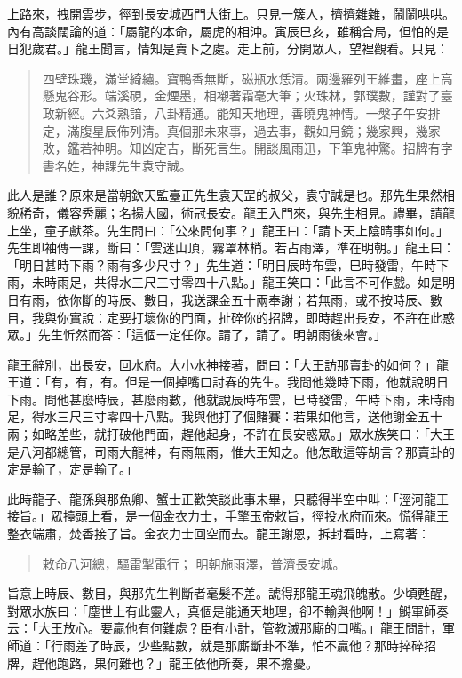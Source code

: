 上路來，拽開雲步，徑到長安城西門大街上。只見一簇人，擠擠雜雜，鬧鬧哄哄。內有高談闊論的道：「屬龍的本命，屬虎的相沖。寅辰巳亥，雖稱合局，但怕的是日犯歲君。」龍王聞言，情知是賣卜之處。走上前，分開眾人，望裡觀看。只見：
\begin{quote}
四壁珠璣，滿堂綺繡。寶鴨香無斷，磁瓶水恁清。兩邊羅列王維畫，座上高懸鬼谷形。端溪硯，金煙墨，相襯著霜毫大筆；火珠林，郭璞數，謹對了臺政新經。六爻熟諳，八卦精通。能知天地理，善曉鬼神情。一槃子午安排定，滿腹星辰佈列清。真個那未來事，過去事，觀如月鏡；幾家興，幾家敗，鑑若神明。知凶定吉，斷死言生。開談風雨迅，下筆鬼神驚。招牌有字書名姓，神課先生袁守誠。
\end{quote}

此人是誰？原來是當朝欽天監臺正先生袁天罡的叔父，袁守誠是也。那先生果然相貌稀奇，儀容秀麗；名揚大國，術冠長安。龍王入門來，與先生相見。禮畢，請龍上坐，童子獻茶。先生問曰：「公來問何事？」龍王曰：「請卜天上陰晴事如何。」先生即袖傳一課，斷曰：「雲迷山頂，霧罩林梢。若占雨澤，準在明朝。」龍王曰：「明日甚時下雨？雨有多少尺寸？」先生道：「明日辰時布雲，巳時發雷，午時下雨，未時雨足，共得水三尺三寸零四十八點。」龍王笑曰：「此言不可作戲。如是明日有雨，依你斷的時辰、數目，我送課金五十兩奉謝；若無雨，或不按時辰、數目，我與你實說：定要打壞你的門面，扯碎你的招牌，即時趕出長安，不許在此惑眾。」先生忻然而答：「這個一定任你。請了，請了。明朝雨後來會。」

龍王辭別，出長安，回水府。大小水神接著，問曰：「大王訪那賣卦的如何？」龍王道：「有，有，有。但是一個掉嘴口討春的先生。我問他幾時下雨，他就說明日下雨。問他甚麼時辰，甚麼雨數，他就說辰時布雲，巳時發雷，午時下雨，未時雨足，得水三尺三寸零四十八點。我與他打了個賭賽：若果如他言，送他謝金五十兩；如略差些，就打破他門面，趕他起身，不許在長安惑眾。」眾水族笑曰：「大王是八河都總管，司雨大龍神，有雨無雨，惟大王知之。他怎敢這等胡言？那賣卦的定是輸了，定是輸了。」

此時龍子、龍孫與那魚卿、蟹士正歡笑談此事未畢，只聽得半空中叫：「涇河龍王接旨。」眾擡頭上看，是一個金衣力士，手擎玉帝敕旨，徑投水府而來。慌得龍王整衣端肅，焚香接了旨。金衣力士回空而去。龍王謝恩，拆封看時，上寫著：
\begin{quote}
敕命八河總，驅雷掣電行；
明朝施雨澤，普濟長安城。
\end{quote}

旨意上時辰、數目，與那先生判斷者毫髮不差。諕得那龍王魂飛魄散。少頃甦醒，對眾水族曰：「塵世上有此靈人，真個是能通天地理，卻不輸與他啊！」鰣軍師奏云：「大王放心。要贏他有何難處？臣有小計，管教滅那廝的口嘴。」龍王問計，軍師道：「行雨差了時辰，少些點數，就是那廝斷卦不準，怕不贏他？那時捽碎招牌，趕他跑路，果何難也？」龍王依他所奏，果不擔憂。

